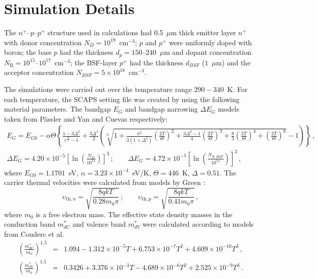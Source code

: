\documentclass[num-refs]{wiley-article} %
\begin{document}
\section{Simulation Details}

The $n^+$--$p$--$p^+$ structure used in calculations
had 0.5~$\mu$m thick emitter layer $n^+$ with donor concentration $N_D=10^{19}$~cm$^{-3}$;
$p$ and $p^+$ were uniformly doped with boron;
the base $p$ had the thickness $d_p=150$--$240$~$\mu$m
and dopant concentration $N_\mathrm{B}=10^{15}$--$10^{17}$~cm$^{-3}$;
the BSF-layer $p^+$ had the thickness $d_{BSF}$ ($1$~$\mu$m)
and the acceptor concentration $N_{BSF}=5\times10^{18}$~cm$^{-3}$.

The simulations  were carried out over the temperature range $290-340$~K.
For each temperature, the SCAPS setting file was created
by using the following material parameters.
The bandgap $E_G$ and bandgap narrowing $\Delta E_G$ models taken from
P\"{a}ssler \cite{Pasler} and Yan and Cuevas \cite{EgNarrow} respectively:
\begin{eqnarray}
\label{eqEg}
E_G=E_{G0}-\alpha\Theta\left\{\frac{1-3\Delta^2}{e^{\frac{\Theta}{T}}-1}
    +\frac{3\Delta^2}{2}\left(\sqrt[6]{1+\frac{\pi^2}{3(1+\Delta^2)}\left(\frac{2T}{\Theta}\right)^2
    +\frac{3\Delta^2-1}{4}\left(\frac{2T}{\Theta}\right)^3+\frac{8}{3}\left(\frac{2T}{\Theta}\right)^4
    +\left(\frac{2T}{\Theta}\right)^6}-1\right)\right\}\,,\\
\Delta E_G=4.20\times10^{-5}\left[\ln\left(\frac{N_{D}}{10^{14}}\right)\right]^3\,;\qquad
     \Delta E_G=4.72\times10^{-5}\left[\ln\left(\frac{N_{B,BSF}}{10^{14}}\right)\right]^3\,,
\end{eqnarray}
where
$E_{G0}=1.1701$~eV,
$\alpha=3.23\times10^{-4}$~eV/K,
$\Theta=446$~K,
$\Delta=0.51$.
The carrier thermal velocities were calculated from models by Green \citep{Nc:Green}:
\begin{equation}
\label{eqVth}
    \upsilon_{\mathrm{th},n}=\sqrt{\frac{8qkT}{0.28m_0\pi}}\,;\qquad
    \upsilon_{\mathrm{th},p}=\sqrt{\frac{8qkT}{0.41m_0\pi}}\,,
\end{equation}
where
$m_0$ is a free electron mass.
The effective state density masses in the conduction band $m^*_{dC}$ and
valence band $m^*_{dV}$ were calculated according to models from Couderc et al. \citep{Si_ni_Couderc}
\begin{eqnarray}
  \left(\frac{m^*_{dC}}{m_0}\right)^{1.5} &=& 1.094-1.312\times10^{-5}T+6.753\times10^{-7}T^2+4.609\times10^{-10}T^3\,, \\
  \left(\frac{m^*_{dV}}{m_0}\right)^{1.5} &=& 0.3426+3.376\times10^{-3}T-4.689\times10^{-6}T^2+2.525\times10^{-9}T^3\,.
\end{eqnarray}
\end{document}
